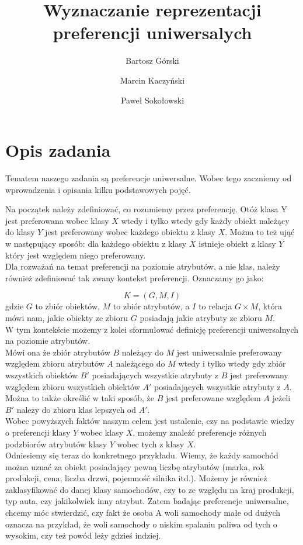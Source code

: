 \documentclass[a4paper,12pt]{article}
\title{Wyznaczanie reprezentacji preferencji uniwersalych}
\author{Bartosz Górski \and Marcin Kaczyński \and Paweł Sokołowski}
\begin{document}
\maketitle

\section{Opis zadania} 
Tematem naszego zadania są preferencje uniwersalne. Wobec tego zaczniemy od wprowadzenia i opisania kilku podstawowych pojęć.

Na początek należy zdefiniować, co rozumiemy przez preferencję. Otóż klasa Y jest preferowana wobec klasy $X$ wtedy i tylko wtedy gdy każdy obiekt należący do klasy $Y$ jest preferowany wobec każdego obiektu z klasy $X$. Można to też ująć w następujący sposób: dla każdego obiektu z klasy $X$ istnieje obiekt z klasy $Y$ który jest względem niego preferowany.  \\

Dla rozważań na temat preferencji na poziomie atrybutów, a nie klas, należy również zdefiniować tak zwany kontekst preferencji. Oznaczamy go jako:

			$$K = (G,M,I)$$
gdzie $G$ to zbiór obiektów, $M$ to zbiór atrybutów, a $I$ to relacja $G \times M$, która mówi nam, jakie obiekty ze zbioru $G$ posiadają jakie atrybuty ze zbioru $M$. \\

W tym kontekście możemy z kolei sformułować definicję preferencji uniwersalnych na poziomie atrybutów.  \\

Mówi ona że zbiór atrybutów $B$ należący do $M$ jest uniwersalnie preferowany względem zbioru atrybutów $A$ należącego do $M$ wtedy i tylko wtedy gdy zbiór wszystkich obiektów $B'$ posiadających wszystkie atrybuty z $B$ jest preferowany względem zbioru wszystkich obiektów $A'$ posiadających wszystkie atrybuty z $A$. Można to także określić w taki sposób, że $B$ jest preferowane względem $A$ jeżeli $B'$ należy do zbioru klas lepszych od $A'$. \\

Wobec powyższych faktów naszym celem jest ustalenie, czy na podstawie wiedzy o preferencji klasy $Y$ wobec klasy $X$, możemy znaleźć preferencje różnych podzbiorów atrybutów klasy $Y$ wobec tych z klasy $X$. \\

Odniesiemy się teraz do konkretnego przykładu. Wiemy, że każdy samochód można uznać za obiekt posiadający pewną liczbę atrybutów (marka, rok produkcji, cena, liczba drzwi, pojemność silnika itd.). Możemy je również zaklasyfikować do danej klasy samochodów, czy to ze względu na kraj produkcji, typ auta, czy jakikolwiek inny atrybut. Zatem badając preferencje uniwersalne, chcemy móc stwierdzić, czy fakt że osoba A woli samochody małe od dużych oznacza na przykład, że woli samochody o niskim spalaniu paliwa od tych o wysokim, czy też powód leży gdzieś indziej.
\end{document}
